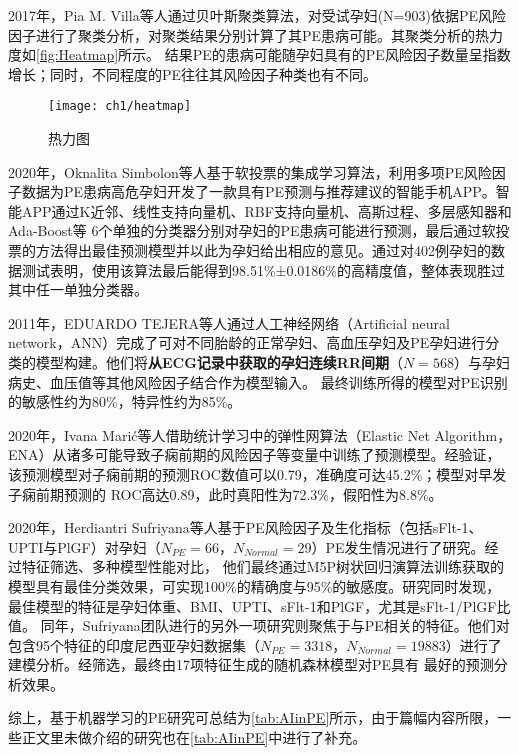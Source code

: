 2017年，Pia M. Villa等人\cite{Villa2017}通过贝叶斯聚类算法，对受试孕妇(N=903)依据PE风险因子进行了聚类分析，对聚类结果分别计算了其PE患病可能。其聚类分析的热力度如\autoref{fig:Heatmap}所示。
结果PE的患病可能随孕妇具有的PE风险因子数量呈指数增长；同时，不同程度的PE往往其风险因子种类也有不同。
\begin{figure}[htbp]
    \centering
    \texttt{[image: ch1/heatmap]}
    \caption{\label{fig:Heatmap}热力图}
\end{figure}

2020年，Oknalita Simbolon等人\cite{Simbolon2020}基于软投票的集成学习算法，利用多项PE风险因子数据为PE患病高危孕妇开发了一款具有PE预测与推荐建议的智能手机APP。智能APP通过K近邻、线性支持向量机、RBF支持向量机、高斯过程、多层感知器和Ada-Boost等
6个单独的分类器分别对孕妇的PE患病可能进行预测，最后通过软投票的方法得出最佳预测模型并以此为孕妇给出相应的意见。通过对402例孕妇的数据测试表明，使用该算法最后能得到98.51\%±0.0186\%的高精度值，整体表现胜过其中任一单独分类器。

2011年，EDUARDO TEJERA等人\cite{Tejera2011}通过人工神经网络（Artificial neural network，ANN）完成了可对不同胎龄的正常孕妇、高血压孕妇及PE孕妇进行分类的模型构建。他们将\textbf{从ECG记录中获取的孕妇连续RR间期}（$N=568$）与孕妇病史、血压值等其他风险因子结合作为模型输入。
最终训练所得的模型对PE识别的敏感性约为80\%，特异性约为85\%。

2020年，Ivana Mari{\'{c}}\cite{Maric2020}等人借助统计学习中的弹性网算法（Elastic Net Algorithm，ENA）从诸多可能导致子痫前期的风险因子等变量中训练了预测模型。经验证，该预测模型对子痫前期的预测ROC数值可以0.79，准确度可达45.2\%；模型对早发子痫前期预测的
ROC高达0.89，此时真阳性为72.3\%，假阳性为8.8\%。

2020年，Herdiantri Sufriyana等人\cite{Sufriyana2020-1}基于PE风险因子及生化指标（包括sFlt-1、UPTI与PlGF）对孕妇（$N_{PE}=66$，$N_{Normal}=29$）PE发生情况进行了研究。经过特征筛选、多种模型性能对比，
他们最终通过M5P树状回归演算法训练获取的模型具有最佳分类效果，可实现100\%的精确度与95\%的敏感度。研究同时发现，最佳模型的特征是孕妇体重、BMI、UPTI、sFlt-1和PlGF，尤其是sFlt-1/PlGF比值。
同年，Sufriyana团队进行的另外一项研究\cite{Sufriyana2020}则聚焦于与PE相关的特征。他们对包含95个特征的印度尼西亚孕妇数据集（$N_{PE}=3318$，$N_{Normal}=19883$）进行了建模分析。经筛选，最终由17项特征生成的随机森林模型对PE具有
最好的预测分析效果。

综上，基于机器学习的PE研究可总结为\autoref{tab:AIinPE}所示，由于篇幅内容所限，一些正文里未做介绍的研究也在\autoref{tab:AIinPE}中进行了补充。

